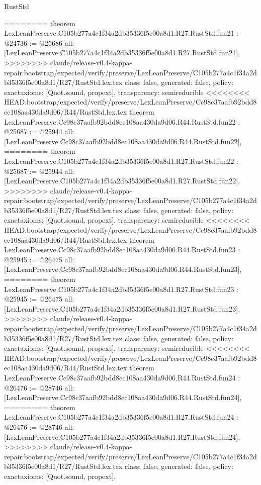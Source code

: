 \begin{lexlean}{RustStd}
\begin{coremodule}
{\begin{coremodule}
{{{{{{{{{{{{{{{{{{{{{{{{========
theorem LexLeanPreserve.C105b277a4c1f34a2db35336f5e00a8d1.R27.RustStd.fun21 : @24736 := @25686 {
  all: [LexLeanPreserve.C105b277a4c1f34a2db35336f5e00a8d1.R27.RustStd.fun21],
>>>>>>>> claude/release-v0.4-kappa-repair:bootstrap/expected/verify/preserve/LexLeanPreserve/C105b277a4c1f34a2db35336f5e00a8d1/R27/RustStd.lex.tex
  class: false,
  generated: false,
  policy: exact{axioms: [Quot.sound, propext]},
  transparency: semireducible
}
<<<<<<<< HEAD:bootstrap/expected/verify/preserve/LexLeanPreserve/Cc98c37aafb92bdd8ec108aa430da9d06/R44/RustStd.lex.tex
theorem LexLeanPreserve.Cc98c37aafb92bdd8ec108aa430da9d06.R44.RustStd.fun22 : @25687 := @25944 {
  all: [LexLeanPreserve.Cc98c37aafb92bdd8ec108aa430da9d06.R44.RustStd.fun22],
========
theorem LexLeanPreserve.C105b277a4c1f34a2db35336f5e00a8d1.R27.RustStd.fun22 : @25687 := @25944 {
  all: [LexLeanPreserve.C105b277a4c1f34a2db35336f5e00a8d1.R27.RustStd.fun22],
>>>>>>>> claude/release-v0.4-kappa-repair:bootstrap/expected/verify/preserve/LexLeanPreserve/C105b277a4c1f34a2db35336f5e00a8d1/R27/RustStd.lex.tex
  class: false,
  generated: false,
  policy: exact{axioms: [Quot.sound, propext]},
  transparency: semireducible
}
<<<<<<<< HEAD:bootstrap/expected/verify/preserve/LexLeanPreserve/Cc98c37aafb92bdd8ec108aa430da9d06/R44/RustStd.lex.tex
theorem LexLeanPreserve.Cc98c37aafb92bdd8ec108aa430da9d06.R44.RustStd.fun23 : @25945 := @26475 {
  all: [LexLeanPreserve.Cc98c37aafb92bdd8ec108aa430da9d06.R44.RustStd.fun23],
========
theorem LexLeanPreserve.C105b277a4c1f34a2db35336f5e00a8d1.R27.RustStd.fun23 : @25945 := @26475 {
  all: [LexLeanPreserve.C105b277a4c1f34a2db35336f5e00a8d1.R27.RustStd.fun23],
>>>>>>>> claude/release-v0.4-kappa-repair:bootstrap/expected/verify/preserve/LexLeanPreserve/C105b277a4c1f34a2db35336f5e00a8d1/R27/RustStd.lex.tex
  class: false,
  generated: false,
  policy: exact{axioms: [Quot.sound, propext]},
  transparency: semireducible
}
<<<<<<<< HEAD:bootstrap/expected/verify/preserve/LexLeanPreserve/Cc98c37aafb92bdd8ec108aa430da9d06/R44/RustStd.lex.tex
theorem LexLeanPreserve.Cc98c37aafb92bdd8ec108aa430da9d06.R44.RustStd.fun24 : @26476 := @28746 {
  all: [LexLeanPreserve.Cc98c37aafb92bdd8ec108aa430da9d06.R44.RustStd.fun24],
========
theorem LexLeanPreserve.C105b277a4c1f34a2db35336f5e00a8d1.R27.RustStd.fun24 : @26476 := @28746 {
  all: [LexLeanPreserve.C105b277a4c1f34a2db35336f5e00a8d1.R27.RustStd.fun24],
>>>>>>>> claude/release-v0.4-kappa-repair:bootstrap/expected/verify/preserve/LexLeanPreserve/C105b277a4c1f34a2db35336f5e00a8d1/R27/RustStd.lex.tex
  class: false,
  generated: false,
  policy: exact{axioms: [Quot.sound, propext]},
}}}}}}}}}}}}}}}}}}}}}}}}}}}}
\end{coremodule}}
\end{coremodule}
\end{lexlean}
